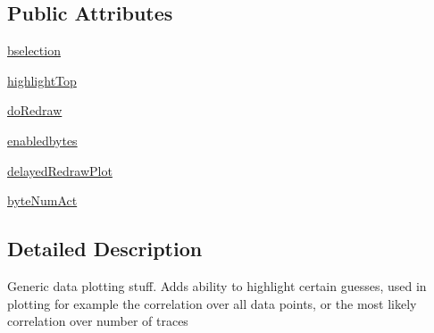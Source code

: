 \subsection*{Public Attributes}
\begin{DoxyCompactItemize}
\item 
\hyperlink{classsoftware_1_1chipwhisperer_1_1common_1_1results_1_1__plotdata_1_1AttackResultPlot_abaa6930969d5c07f5a724d8055a1ea7b}{bselection}
\item 
\hyperlink{classsoftware_1_1chipwhisperer_1_1common_1_1results_1_1__plotdata_1_1AttackResultPlot_af92b8a374c600cd3e8c5cf55118dccff}{highlight\+Top}
\item 
\hyperlink{classsoftware_1_1chipwhisperer_1_1common_1_1results_1_1__plotdata_1_1AttackResultPlot_a717d22e257fa005046d2c8ec4b2d5860}{do\+Redraw}
\item 
\hyperlink{classsoftware_1_1chipwhisperer_1_1common_1_1results_1_1__plotdata_1_1AttackResultPlot_ac0d4e92a773fb657a496c5a1fc512546}{enabledbytes}
\item 
\hyperlink{classsoftware_1_1chipwhisperer_1_1common_1_1results_1_1__plotdata_1_1AttackResultPlot_a564265b8d5b6b38341cdeda211044f9c}{delayed\+Redraw\+Plot}
\item 
\hyperlink{classsoftware_1_1chipwhisperer_1_1common_1_1results_1_1__plotdata_1_1AttackResultPlot_afd9b72192bfb5d8de5b5c963bff60d6d}{byte\+Num\+Act}
\end{DoxyCompactItemize}


\subsection{Detailed Description}
\begin{DoxyVerb}Generic data plotting stuff. Adds ability to highlight certain guesses, used in plotting for example the
correlation over all data points, or the most likely correlation over number of traces
\end{DoxyVerb}
 

